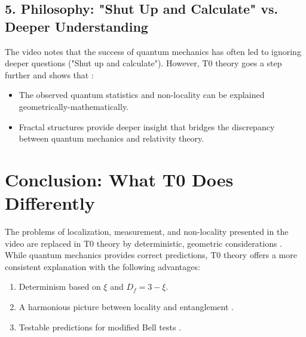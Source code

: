 	\subsection*{5. Philosophy: "Shut Up and Calculate" vs. Deeper Understanding}
	
	The video notes that the success of quantum mechanics has often led to ignoring deeper questions ("Shut up and calculate"). However, T0 theory goes a step further and shows that \cite{NoGoEn}:
	\begin{itemize}
		\item The observed quantum statistics and non-locality can be explained geometrically-mathematically.
		\item Fractal structures provide deeper insight that bridges the discrepancy between quantum mechanics and relativity theory.
	\end{itemize}
	
	\section*{Conclusion: What T0 Does Differently}
	
	The problems of localization, measurement, and non-locality presented in the video \cite{VideoBell2024} are replaced in T0 theory by deterministic, geometric considerations \cite{Bell_En}. While quantum mechanics provides correct predictions, T0 theory offers a more consistent explanation with the following advantages:
	
	\begin{enumerate}
		\item Determinism based on $\xi$ and $D_f = 3 - \xi$.
		\item A harmonious picture between locality and entanglement \cite{131_scheinbar_instantan_En}.
		\item Testable predictions for modified Bell tests \cite{DynMassePhotonenNichtlokalEn, 023_Bell_En_ch}.
	\end{enumerate}
	
